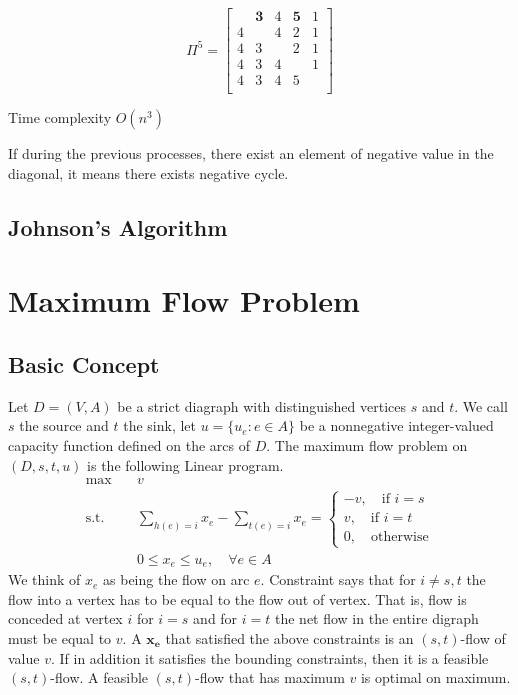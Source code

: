 				\begin{equation}
					\Pi^5 = \begin{bmatrix}
						& \mathbf{3} & 4 & \mathbf{5} & 1 \\
						4 & & 4 & 2 & 1\\
						4 & 3 & & 2 & 1 \\
						4 & 3 & 4 & & 1\\
						4 & 3 & 4 & 5 & \\
					\end{bmatrix}
				\end{equation}

				Time complexity $O(n^3)$

				If during the previous processes, there exist an element of negative value in the diagonal, it means there exists negative cycle.

			\section{Johnson's Algorithm}

		\chapter{Maximum Flow Problem}
			\section{Basic Concept}
				Let $D=(V, A)$ be a strict diagraph with distinguished vertices $s$ and $t$. We call $s$ the source and $t$ the sink, let $u=\{u_e: e\in A\}$ be a nonnegative integer-valued capacity function defined on the arcs of $D$. The maximum flow problem on $(D, s, t, u)$ is the following Linear program.
				\begin{align}
					\max \quad & v\\
					\text{s.t.} \quad & \sum_{h(e)=i}x_e - \sum_{t(e) = i} x_e = \begin{cases}
						-v, \quad \text{if } i = s\\
						v, \quad \text{if } i = t \\
						0, \quad \text{otherwise}
					\end{cases}\\
					& 0\le x_e \le u_e, \quad \forall e\in A
				\end{align}
				We think of $x_e$ as being the flow on arc $e$. Constraint says that for $i \neq s, t$ the flow into a vertex has to be equal to the flow out of vertex. That is, flow is conceded at vertex $i$ for $i=s$ and for $i=t$ the net flow in the entire digraph must be equal to $v$.
				A $\mathbf{x_e}$ that satisfied the above constraints is an $(s,t)$-flow of value $v$. If in addition it satisfies the bounding constraints, then it is a feasible $(s,t)$-flow.
				A feasible $(s,t)$-flow that has maximum $v$ is optimal on maximum.

